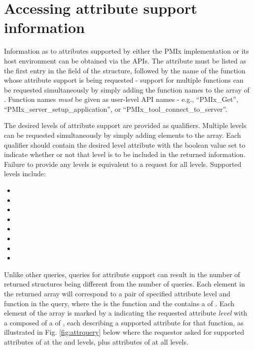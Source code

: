 \section{Accessing attribute support information}
\label{chap:api_job_mgmt:queryattrs}

Information as to attributes supported by either the \ac{PMIx} implementation or its host environment can be obtained via the  \acp{API}. The  attribute must be listed as the first entry in the  field of the  structure, followed by the name of the function whose attribute support is being requested - support for multiple functions can be requested simultaneously by simply adding the function names to the array of . Function names \emph{must} be given as user-level \ac{API} names - e.g., ``PMIx_Get'', ``PMIx_server_setup_application'', or ``PMIx_tool_connect_to_server''.

The desired levels of attribute support are provided as qualifiers. Multiple levels can be requested simultaneously by simply adding elements to the  array. Each qualifier should contain the desired level attribute with the boolean value set to indicate whether or not that level is to be included in the returned information. Failure to provide any levels is equivalent to a request for all levels. Supported levels include:

\begin{itemize}
    \item {}
    \item {}
    \item {}
    \item {}
    \item {}
    \item {}
    \item {}
    \item {}
\end{itemize}

Unlike other queries, queries for attribute support can result in the number of returned  structures being different from the number of queries. Each element in the returned array will correspond to a pair of specified attribute level and function in the query, where the  is the function and the  contains a  of . Each element of the array is marked by a  indicating the requested attribute \emph{level} with a  composed of a  of , each describing a supported attribute for that function, as illustrated in Fig. \ref{fig:attrquery} below where the requestor asked for supported attributes of  at the  and  levels, plus attributes of  at all levels.

